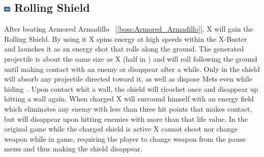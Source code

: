 \subsection{\includegraphics[width=12px, height=10px]{figures/X1/weapons/Rolling_S.jpg} Rolling Shield}\label{Rolling_shield}
After beating Armored Armadillo ~[\ref{boss:Armored_Armadillo}], X will gain the Rolling Shield. By using it X spins energy at high speeds within the X-Buster and launches it as an energy shot that rolls along the ground. The generated projectile is about the same size as X (half in \mhx) and will roll following the ground until making contact with an enemy or disappear after a while. Only in \mhx the shield will absorb any projectile directed toward it, as well as dispose Mets even while hiding~\cite{wiki:Rolling_shield}. Upon contact whit a wall, the shield will ricochet once and disappear up hitting a wall again. When charged X will surround himself with an energy field which eliminates any enemy with less than three hit points that makes contact, but will disappear upon hitting enemies with more than that life value. In the original game while the charged shield is active X cannot shoot nor change weapon while in game, requiring the player to change weapon from the pause menu and thus making the shield disappear.
